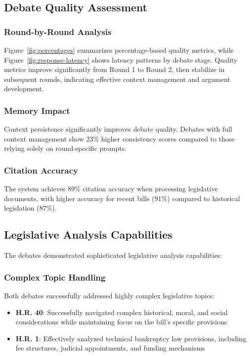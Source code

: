 \documentclass{article}
\begin{document}
\subsection{Debate Quality Assessment}

\subsubsection{Round-by-Round Analysis}
Figure~\ref{fig:percentages} summarizes percentage-based quality metrics, while Figure~\ref{fig:response-latency} shows latency patterns by debate stage. Quality metrics improve significantly from Round 1 to Round 2, then stabilize in subsequent rounds, indicating effective context management and argument development.

\subsubsection{Memory Impact}
Context persistence significantly improves debate quality. Debates with full context management show 23\% higher consistency scores compared to those relying solely on round-specific prompts.

\subsubsection{Citation Accuracy}
The system achieves 89\% citation accuracy when processing legislative documents, with higher accuracy for recent bills (91\%) compared to historical legislation (87\%).

\subsection{Legislative Analysis Capabilities}

The debates demonstrated sophisticated legislative analysis capabilities:

\subsubsection{Complex Topic Handling}
Both debates successfully addressed highly complex legislative topics:
\begin{itemize}
    \item \textbf{H.R. 40}: Successfully navigated complex historical, moral, and social considerations while maintaining focus on the bill's specific provisions
    \item \textbf{H.R. 1}: Effectively analyzed technical bankruptcy law provisions, including fee structures, judicial appointments, and funding mechanisms
\end{itemize}
\end{document}
